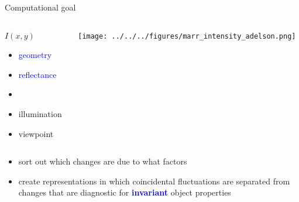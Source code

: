 \documentclass[]{beamer}
\begin{document}
\begin{frame}{Computational goal}
\begin{overlayarea}{110mm}{50mm}
\begin{columns}[T]
\begin{column}{27mm}
\vspace{5mm}
$I(x,y)$
\begin{itemize}
 \item \textcolor<3>{blue}{geometry}
 \item \textcolor<3>{blue}{reflectance}
 \item[]
 \item illumination
 \item viewpoint
\end{itemize}

\end{column}
\begin{column}{83mm}
  \begin{center}  
\texttt{[image: ../../../figures/marr\_intensity\_adelson.png]}
  \end{center}
\end{column}
\end{columns}
\end{overlayarea}

\begin{itemize}
  \item<2->[$\Rightarrow$] sort out which changes are due to what factors
  \item<3->[$\Rightarrow$] create representations in which coincidental fluctuations are separated from changes that are diagnostic for \textcolor<3>{blue}{\textbf{invariant}} object properties
\end{itemize}
\end{frame}
\end{document}
